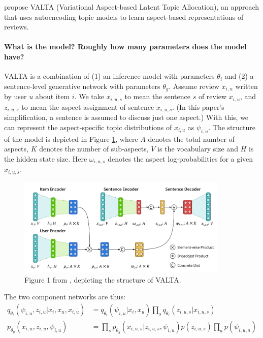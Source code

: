 \documentclass[11pt]{article}
\begin{document}
\cite{esmaeili2018structured} propose VALTA (Variational Aspect-based Latent Topic Allocation), an approach that uses autoencoding topic models to learn aspect-based representations of reviews.

\paragraph{What is the model? Roughly how many parameters does the model have?} 

VALTA is a combination of (1) an inference model with parameters $\theta_i$ and (2) a sentence-level generative network with parameters $\theta_g$. Assume review $x_{i,u}$ written by user $u$ about item $i$. We take $x_{i,u,s}$ to mean the sentence $s$ of review $x_{i,u}$, and $z_{i,u,s}$ to mean the aspect assignment of sentence $x_{i,u,s}$. (In this paper's simplification, a sentence is assumed to discuss just one aspect.) With this, we can represent the aspect-specific topic distributions of $x_{i,u}$ as $\psi_{i,u}$. The structure of the model is depicted in Figure \ref{fig:valta}, where $A$ denotes the total number of aspects, $K$ denotes the number of sub-aspects, $V$ is the vocabulary size and $H$ is the hidden state size. Here $\omega_{i,u,s}$ denotes the aspect log-probabilities for a given $x_{i,u,s}$.

\begin{figure}[h]
  \centering
  \includegraphics[width=0.9\textwidth]{esmaili-fig1.png}
  \caption{Figure 1 from \cite{esmaeili2018structured}, depicting the structure of VALTA.}
  \label{fig:valta}
\end{figure}

The two component networks are thus:
\begin{align*}
  q_{\theta_i}(\psi_{i,u},z_{i,u}|x_i,x_u,x_{i,u}) &= q_{\theta_i}(\psi_{i,u} | x_i,x_u) \prod_s q_{\theta_i}(z_{i,u,s}|x_{i,u,s}) \\
  p_{\theta_g}(x_{i,u},z_{i,u},\psi_{i,u}) &= \prod_s p_{\theta_g}(x_{i,u,s}|z_{i,u,s},\psi_{i,u})p(z_{i,u,s})\prod_a p(\psi_{i,u,a})
\end{align*}
\end{document}
